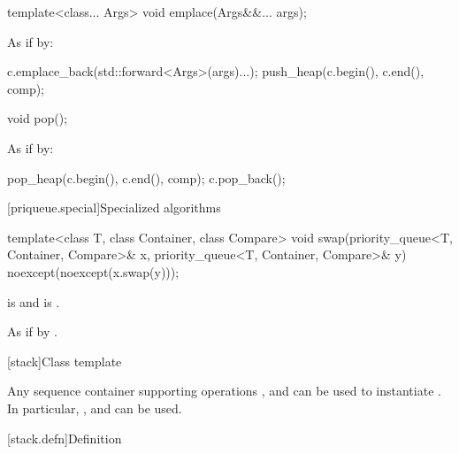 %
\begin{itemdecl}
template<class... Args> void emplace(Args&&... args);
\end{itemdecl}

\begin{itemdescr}
\pnum
\effects
As if by:
\begin{codeblock}
c.emplace_back(std::forward<Args>(args)...);
push_heap(c.begin(), c.end(), comp);
\end{codeblock}
\end{itemdescr}


%
\begin{itemdecl}
void pop();
\end{itemdecl}

\begin{itemdescr}
\pnum
\effects
As if by:
\begin{codeblock}
pop_heap(c.begin(), c.end(), comp);
c.pop_back();
\end{codeblock}
\end{itemdescr}

[priqueue.special]{Specialized algorithms}

%
\begin{itemdecl}
template<class T, class Container, class Compare>
  void swap(priority_queue<T, Container, Compare>& x,
            priority_queue<T, Container, Compare>& y) noexcept(noexcept(x.swap(y)));
\end{itemdecl}

\begin{itemdescr}
\pnum
\constraints
{} is  and
 is .

\pnum
\effects
As if by .
\end{itemdescr}

[stack]{Class template }

\pnum
{}%
Any sequence container supporting operations
,
and
can be used to instantiate
.
In particular,
,
and
can be used.

[stack.defn]{Definition}

